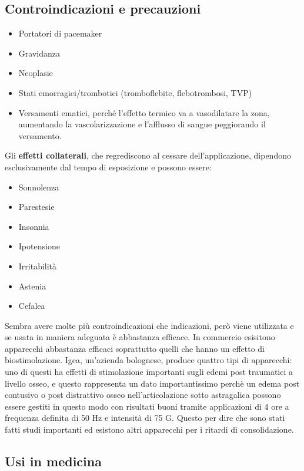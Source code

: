 \subsection{Controindicazioni e precauzioni }

\begin{itemize}
\item
  Portatori di pacemaker
\item
  Gravidanza
\item
  Neoplasie
\item
  Stati emorragici/trombotici (tromboflebite, flebotrombosi, TVP)
\item
  Versamenti ematici, perché l'effetto termico va a vasodilatare la
  zona, aumentando la vascolarizzazione e l'afflusso di sangue
  peggiorando il versamento.
\end{itemize}

Gli \textbf{effetti collaterali}, che regrediscono al cessare
dell'applicazione, dipendono esclusivamente dal tempo di esposizione e
possono essere:

\begin{itemize}
\item
  Sonnolenza
\item
  Parestesie
\item
  Insonnia
\item
  Ipotensione
\item
  Irritabilità
\item
  Astenia
\item
  Cefalea
\end{itemize}

Sembra avere molte più controindicazioni che indicazioni, però viene
utilizzata e se usata in maniera adeguata è abbastanza efficace. In
commercio esisitono apparecchi abbastanza efficaci soprattutto quelli
che hanno un effetto di biostimolazione. Igea, un'azienda bolognese,
produce quattro tipi di apparecchi: uno di questi ha effetti di
stimolazione importanti sugli edemi post traumatici a livello osseo, e
questo rappresenta un dato importantissimo perchè un edema post
contusivo o post distrattivo osseo nell'articolazione sotto astragalica
possono essere gestiti in questo modo con risultati buoni tramite
applicazioni di 4 ore a frequenza definita di 50 Hz e intensità di 75 G.
Questo per dire che sono stati fatti studi importanti ed esistono altri
apparecchi per i ritardi di consolidazione.

\subsection{Usi in medicina }

